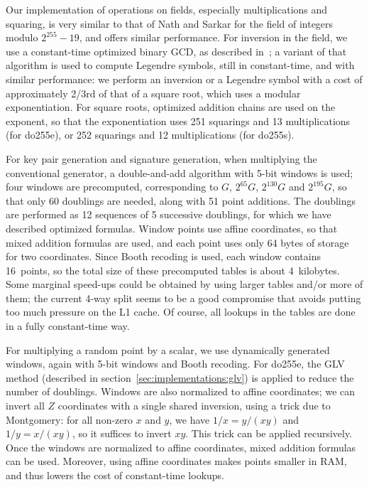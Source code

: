 \documentclass{llncs}
\begin{document}
Our implementation of operations on fields, especially multiplications
and squaring, is very similar to that of Nath and
Sarkar\cite{NatSar2018} for the field of integers modulo $2^{255}-19$,
and offers similar performance. For inversion in the field, we use a
constant-time optimized binary GCD, as described in~\cite{Por2020-3}; a
variant of that algorithm is used to compute Legendre symbols, still in
constant-time, and with similar performance: we perform an inversion or
a Legendre symbol with a cost of approximately 2/3rd of that of a square
root, which uses a modular exponentiation. For square roots, optimized
addition chains are used on the exponent, so that the exponentiation
uses 251 squarings and 13 multiplications (for do255e), or 252 squarings
and 12 multiplications (for do255s).

For key pair generation and signature generation, when multiplying the
conventional generator, a double-and-add algorithm with 5-bit windows is
used; four windows are precomputed, corresponding to $G$, $2^{65}G$,
$2^{130}G$ and $2^{195}G$, so that only 60 doublings are needed, along
with 51 point additions. The doublings are performed as 12 sequences of
5 successive doublings, for which we have described optimized formulas.
Window points use affine coordinates, so that mixed addition formulas
are used, and each point uses only 64 bytes of storage for two
coordinates. Since Booth recoding\cite{Boo1951} is used, each window
contains 16~points, so the total size of these precomputed tables is
about 4~kilobytes. Some marginal speed-ups could be obtained by using
larger tables and/or more of them; the current 4-way split seems to be a
good compromise that avoids putting too much pressure on the L1 cache.
Of course, all lookups in the tables are done in a fully constant-time
way.

For multiplying a random point by a scalar, we use dynamically generated
windows, again with 5-bit windows and Booth recoding. For do255e, the
GLV method (described in section~\ref{sec:implementations:glv}) is
applied to reduce the number of doublings. Windows are also normalized
to affine coordinates; we can invert all $Z$ coordinates with a single
shared inversion, using a trick due to Montgomery: for all non-zero $x$
and $y$, we have $1/x = y/(xy)$ and $1/y = x/(xy)$, so it suffices to
invert $xy$. This trick can be applied recursively. Once the windows are
normalized to affine coordinates, mixed addition formulas can be used.
Moreover, using affine coordinates makes points smaller in RAM, and thus
lowers the cost of constant-time lookups.
\end{document}
